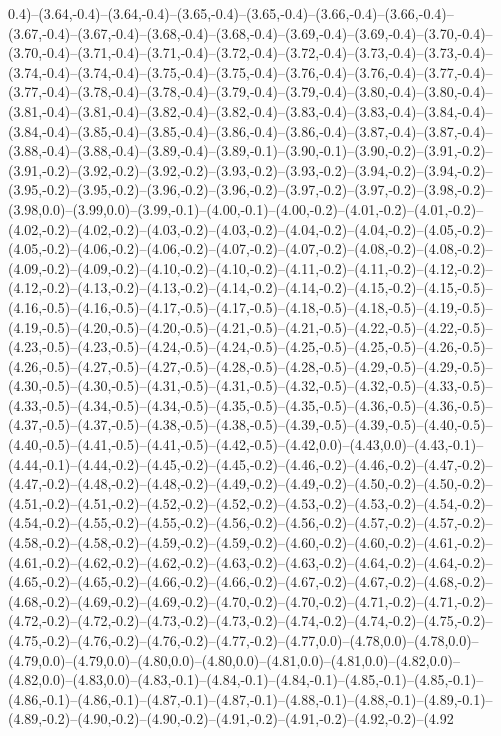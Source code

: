 0.4)--(3.64,-0.4)--(3.64,-0.4)--(3.65,-0.4)--(3.65,-0.4)--(3.66,-0.4)--(3.66,-0.4)--(3.67,-0.4)--(3.67,-0.4)--(3.68,-0.4)--(3.68,-0.4)--(3.69,-0.4)--(3.69,-0.4)--(3.70,-0.4)--(3.70,-0.4)--(3.71,-0.4)--(3.71,-0.4)--(3.72,-0.4)--(3.72,-0.4)--(3.73,-0.4)--(3.73,-0.4)--(3.74,-0.4)--(3.74,-0.4)--(3.75,-0.4)--(3.75,-0.4)--(3.76,-0.4)--(3.76,-0.4)--(3.77,-0.4)--(3.77,-0.4)--(3.78,-0.4)--(3.78,-0.4)--(3.79,-0.4)--(3.79,-0.4)--(3.80,-0.4)--(3.80,-0.4)--(3.81,-0.4)--(3.81,-0.4)--(3.82,-0.4)--(3.82,-0.4)--(3.83,-0.4)--(3.83,-0.4)--(3.84,-0.4)--(3.84,-0.4)--(3.85,-0.4)--(3.85,-0.4)--(3.86,-0.4)--(3.86,-0.4)--(3.87,-0.4)--(3.87,-0.4)--(3.88,-0.4)--(3.88,-0.4)--(3.89,-0.4)--(3.89,-0.1)--(3.90,-0.1)--(3.90,-0.2)--(3.91,-0.2)--(3.91,-0.2)--(3.92,-0.2)--(3.92,-0.2)--(3.93,-0.2)--(3.93,-0.2)--(3.94,-0.2)--(3.94,-0.2)--(3.95,-0.2)--(3.95,-0.2)--(3.96,-0.2)--(3.96,-0.2)--(3.97,-0.2)--(3.97,-0.2)--(3.98,-0.2)--(3.98,0.0)--(3.99,0.0)--(3.99,-0.1)--(4.00,-0.1)--(4.00,-0.2)--(4.01,-0.2)--(4.01,-0.2)--(4.02,-0.2)--(4.02,-0.2)--(4.03,-0.2)--(4.03,-0.2)--(4.04,-0.2)--(4.04,-0.2)--(4.05,-0.2)--(4.05,-0.2)--(4.06,-0.2)--(4.06,-0.2)--(4.07,-0.2)--(4.07,-0.2)--(4.08,-0.2)--(4.08,-0.2)--(4.09,-0.2)--(4.09,-0.2)--(4.10,-0.2)--(4.10,-0.2)--(4.11,-0.2)--(4.11,-0.2)--(4.12,-0.2)--(4.12,-0.2)--(4.13,-0.2)--(4.13,-0.2)--(4.14,-0.2)--(4.14,-0.2)--(4.15,-0.2)--(4.15,-0.5)--(4.16,-0.5)--(4.16,-0.5)--(4.17,-0.5)--(4.17,-0.5)--(4.18,-0.5)--(4.18,-0.5)--(4.19,-0.5)--(4.19,-0.5)--(4.20,-0.5)--(4.20,-0.5)--(4.21,-0.5)--(4.21,-0.5)--(4.22,-0.5)--(4.22,-0.5)--(4.23,-0.5)--(4.23,-0.5)--(4.24,-0.5)--(4.24,-0.5)--(4.25,-0.5)--(4.25,-0.5)--(4.26,-0.5)--(4.26,-0.5)--(4.27,-0.5)--(4.27,-0.5)--(4.28,-0.5)--(4.28,-0.5)--(4.29,-0.5)--(4.29,-0.5)--(4.30,-0.5)--(4.30,-0.5)--(4.31,-0.5)--(4.31,-0.5)--(4.32,-0.5)--(4.32,-0.5)--(4.33,-0.5)--(4.33,-0.5)--(4.34,-0.5)--(4.34,-0.5)--(4.35,-0.5)--(4.35,-0.5)--(4.36,-0.5)--(4.36,-0.5)--(4.37,-0.5)--(4.37,-0.5)--(4.38,-0.5)--(4.38,-0.5)--(4.39,-0.5)--(4.39,-0.5)--(4.40,-0.5)--(4.40,-0.5)--(4.41,-0.5)--(4.41,-0.5)--(4.42,-0.5)--(4.42,0.0)--(4.43,0.0)--(4.43,-0.1)--(4.44,-0.1)--(4.44,-0.2)--(4.45,-0.2)--(4.45,-0.2)--(4.46,-0.2)--(4.46,-0.2)--(4.47,-0.2)--(4.47,-0.2)--(4.48,-0.2)--(4.48,-0.2)--(4.49,-0.2)--(4.49,-0.2)--(4.50,-0.2)--(4.50,-0.2)--(4.51,-0.2)--(4.51,-0.2)--(4.52,-0.2)--(4.52,-0.2)--(4.53,-0.2)--(4.53,-0.2)--(4.54,-0.2)--(4.54,-0.2)--(4.55,-0.2)--(4.55,-0.2)--(4.56,-0.2)--(4.56,-0.2)--(4.57,-0.2)--(4.57,-0.2)--(4.58,-0.2)--(4.58,-0.2)--(4.59,-0.2)--(4.59,-0.2)--(4.60,-0.2)--(4.60,-0.2)--(4.61,-0.2)--(4.61,-0.2)--(4.62,-0.2)--(4.62,-0.2)--(4.63,-0.2)--(4.63,-0.2)--(4.64,-0.2)--(4.64,-0.2)--(4.65,-0.2)--(4.65,-0.2)--(4.66,-0.2)--(4.66,-0.2)--(4.67,-0.2)--(4.67,-0.2)--(4.68,-0.2)--(4.68,-0.2)--(4.69,-0.2)--(4.69,-0.2)--(4.70,-0.2)--(4.70,-0.2)--(4.71,-0.2)--(4.71,-0.2)--(4.72,-0.2)--(4.72,-0.2)--(4.73,-0.2)--(4.73,-0.2)--(4.74,-0.2)--(4.74,-0.2)--(4.75,-0.2)--(4.75,-0.2)--(4.76,-0.2)--(4.76,-0.2)--(4.77,-0.2)--(4.77,0.0)--(4.78,0.0)--(4.78,0.0)--(4.79,0.0)--(4.79,0.0)--(4.80,0.0)--(4.80,0.0)--(4.81,0.0)--(4.81,0.0)--(4.82,0.0)--(4.82,0.0)--(4.83,0.0)--(4.83,-0.1)--(4.84,-0.1)--(4.84,-0.1)--(4.85,-0.1)--(4.85,-0.1)--(4.86,-0.1)--(4.86,-0.1)--(4.87,-0.1)--(4.87,-0.1)--(4.88,-0.1)--(4.88,-0.1)--(4.89,-0.1)--(4.89,-0.2)--(4.90,-0.2)--(4.90,-0.2)--(4.91,-0.2)--(4.91,-0.2)--(4.92,-0.2)--(4.92